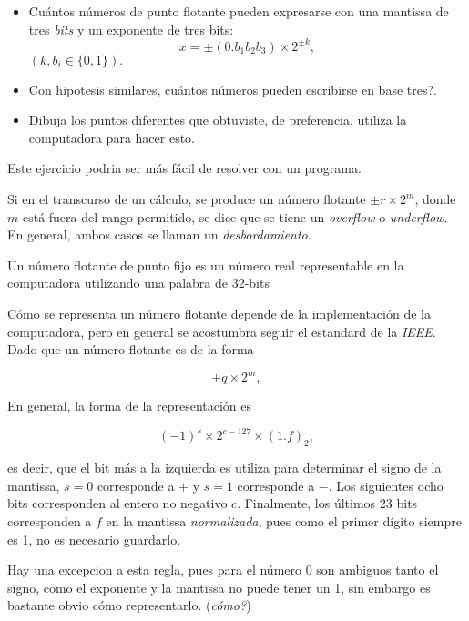 \documentclass[spanish]{amsart}
\begin{document}
\begin{exercise}
  \begin{itemize}
  \item Cuántos números de punto flotante pueden expresarse con una mantissa de tres \emph{bits} y un exponente de tres bits:
\[x = \pm(0.b_1b_2b_3) \times 2^{\pm k},\]
$(k, b_i \in \{0, 1\}).$
\item Con hipotesis similares, cuántos números pueden escribirse en base tres?.
\item Dibuja los puntos diferentes que obtuviste, de preferencia, utiliza la computadora para hacer esto.
\end{itemize}
Este ejercicio podria ser más fácil de resolver con un programa.
\end{exercise}

\begin{definition}
Si en el transcurso de un cálculo, se produce un número flotante $\pm r \times 2^m$, donde $m$ está fuera del rango permitido, se dice que se tiene un \emph{overflow} o \emph{underflow}. En general, ambos casos se llaman un \emph{desbordamiento}.  
\end{definition}

\begin{definition}
  Un número flotante de punto fijo es un número real representable en la computadora utilizando una palabra de 32-bits
\end{definition}

Cómo se representa un número flotante depende de la implementación de la computadora, pero en general se acostumbra seguir el estandard de la \emph{IEEE}. Dado que un  número flotante es de la forma

\[\pm q \times 2^m,\]

En general, la forma de la representación es 

\[(-1)^s \times 2^{c - 127} \times (1.f)_2,\]

es decir, que el bit más a la izquierda es utiliza para determinar el signo de la mantissa, $s = 0$ corresponde a $+$ y $s = 1$ corresponde a $-$. Los siguientes ocho bits corresponden al entero  no negativo $c$. Finalmente, los últimos 23 bits corresponden a $f$ en la mantissa \emph{normalizada}, pues como el primer dígito siempre es 1, no es necesario guardarlo.

\begin{remark}
  Hay una excepcion a esta regla, pues para el número 0 son ambiguos tanto el signo, como el exponente y la mantissa no puede tener un 1, sin embargo es bastante obvio cómo representarlo. (\emph{cómo?})
\end{remark}
\end{document}
